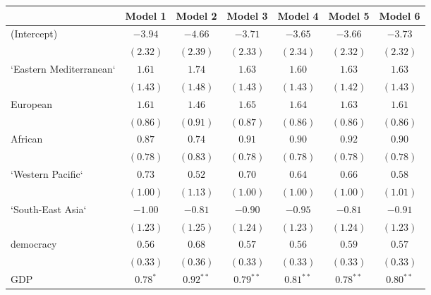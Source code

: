 
\begin{table}[!h]
\begin{center}
\begin{tabular}{l c c c c c c }
\toprule
 & Model 1 & Model 2 & Model 3 & Model 4 & Model 5 & Model 6 \\
\midrule
(Intercept)             & $-3.94$      & $-4.66$      & $-3.71$      & $-3.65$      & $-3.66$      & $-3.73$      \\
                        & $(2.32)$     & $(2.39)$     & $(2.33)$     & $(2.34)$     & $(2.32)$     & $(2.32)$     \\
`Eastern Mediterranean` & $1.61$       & $1.74$       & $1.63$       & $1.60$       & $1.63$       & $1.63$       \\
                        & $(1.43)$     & $(1.48)$     & $(1.43)$     & $(1.43)$     & $(1.42)$     & $(1.43)$     \\
European                & $1.61$       & $1.46$       & $1.65$       & $1.64$       & $1.63$       & $1.61$       \\
                        & $(0.86)$     & $(0.91)$     & $(0.87)$     & $(0.86)$     & $(0.86)$     & $(0.86)$     \\
African                 & $0.87$       & $0.74$       & $0.91$       & $0.90$       & $0.92$       & $0.90$       \\
                        & $(0.78)$     & $(0.83)$     & $(0.78)$     & $(0.78)$     & $(0.78)$     & $(0.78)$     \\
`Western Pacific`       & $0.73$       & $0.52$       & $0.70$       & $0.64$       & $0.66$       & $0.58$       \\
                        & $(1.00)$     & $(1.13)$     & $(1.00)$     & $(1.00)$     & $(1.00)$     & $(1.01)$     \\
`South-East Asia`       & $-1.00$      & $-0.81$      & $-0.90$      & $-0.95$      & $-0.81$      & $-0.91$      \\
                        & $(1.23)$     & $(1.25)$     & $(1.24)$     & $(1.23)$     & $(1.24)$     & $(1.23)$     \\
democracy               & $0.56$       & $0.68$       & $0.57$       & $0.56$       & $0.59$       & $0.57$       \\
                        & $(0.33)$     & $(0.36)$     & $(0.33)$     & $(0.33)$     & $(0.33)$     & $(0.33)$     \\
GDP                     & $0.78^{*}$   & $0.92^{**}$  & $0.79^{**}$  & $0.81^{**}$  & $0.78^{**}$  & $0.80^{**}$  \\

\end{tabular}
\end{center}
\end{table}
